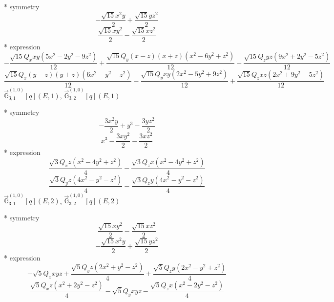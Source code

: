\documentclass[fleqn,8pt]{jsarticle}
\begin{document}
\noindent\quad ** symmetry
\begin{dmath*}
- \frac{\sqrt{15} x^{2} y}{2} + \frac{\sqrt{15} y z^{2}}{2}
\end{dmath*}
\begin{dmath*}
\frac{\sqrt{15} x y^{2}}{2} - \frac{\sqrt{15} x z^{2}}{2}
\end{dmath*}
\noindent\quad ** expression
\begin{dmath*}
- \frac{\sqrt{15} Q_{x} x y \left(5 x^{2} - 2 y^{2} - 9 z^{2}\right)}{12} + \frac{\sqrt{15} Q_{y} \left(x - z\right) \left(x + z\right) \left(x^{2} - 6 y^{2} + z^{2}\right)}{12} - \frac{\sqrt{15} Q_{z} y z \left(9 x^{2} + 2 y^{2} - 5 z^{2}\right)}{12}
\end{dmath*}
\begin{dmath*}
\frac{\sqrt{15} Q_{x} \left(y - z\right) \left(y + z\right) \left(6 x^{2} - y^{2} - z^{2}\right)}{12} - \frac{\sqrt{15} Q_{y} x y \left(2 x^{2} - 5 y^{2} + 9 z^{2}\right)}{12} + \frac{\sqrt{15} Q_{z} x z \left(2 x^{2} + 9 y^{2} - 5 z^{2}\right)}{12}
\end{dmath*}
\noindent\quad $\vec{\mathbb{G}}_{3,1}^{(1,0)}[q](E,1)$, $\vec{\mathbb{G}}_{3,2}^{(1,0)}[q](E,1)$

\noindent\quad ** symmetry
\begin{dmath*}
- \frac{3 x^{2} y}{2} + y^{3} - \frac{3 y z^{2}}{2}
\end{dmath*}
\begin{dmath*}
x^{3} - \frac{3 x y^{2}}{2} - \frac{3 x z^{2}}{2}
\end{dmath*}
\noindent\quad ** expression
\begin{dmath*}
\frac{\sqrt{3} Q_{x} z \left(x^{2} - 4 y^{2} + z^{2}\right)}{4} - \frac{\sqrt{3} Q_{z} x \left(x^{2} - 4 y^{2} + z^{2}\right)}{4}
\end{dmath*}
\begin{dmath*}
\frac{\sqrt{3} Q_{y} z \left(4 x^{2} - y^{2} - z^{2}\right)}{4} - \frac{\sqrt{3} Q_{z} y \left(4 x^{2} - y^{2} - z^{2}\right)}{4}
\end{dmath*}
\noindent\quad $\vec{\mathbb{G}}_{3,1}^{(1,0)}[q](E,2)$, $\vec{\mathbb{G}}_{3,2}^{(1,0)}[q](E,2)$

\noindent\quad ** symmetry
\begin{dmath*}
\frac{\sqrt{15} x y^{2}}{2} - \frac{\sqrt{15} x z^{2}}{2}
\end{dmath*}
\begin{dmath*}
- \frac{\sqrt{15} x^{2} y}{2} + \frac{\sqrt{15} y z^{2}}{2}
\end{dmath*}
\noindent\quad ** expression
\begin{dmath*}
- \sqrt{5} Q_{x} x y z + \frac{\sqrt{5} Q_{y} z \left(2 x^{2} + y^{2} - z^{2}\right)}{4} + \frac{\sqrt{5} Q_{z} y \left(2 x^{2} - y^{2} + z^{2}\right)}{4}
\end{dmath*}
\begin{dmath*}
\frac{\sqrt{5} Q_{x} z \left(x^{2} + 2 y^{2} - z^{2}\right)}{4} - \sqrt{5} Q_{y} x y z - \frac{\sqrt{5} Q_{z} x \left(x^{2} - 2 y^{2} - z^{2}\right)}{4}
\end{dmath*}
\end{document}
